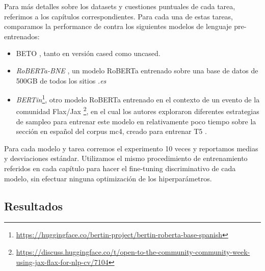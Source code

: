 Para más detalles sobre los datasets y cuestiones puntuales de cada tarea, referimos a los capítulos correspondientes. Para cada una de estas tareas, comparamos la performance de \robertuito{} contra los siguientes modelos de lenguaje pre-entrenados:

\begin{itemize}
    \item BETO \cite{canete2020spanish}, tanto en versión cased como uncased.
    \item \emph{RoBERTa-BNE} \cite{gutierrezfandino2021spanish}, un modelo RoBERTa entrenado sobre una base de datos de 500GB de todos los sitios \emph{.es}
    \item \emph{BERTin}\footnote{\url{https://huggingface.co/bertin-project/bertin-roberta-base-spanish}}, otro modelo RoBERTa entrenado en el contexto de un evento de la comunidad Flax/Jax \footnote{\url{https://discuss.huggingface.co/t/open-to-the-community-community-week-using-jax-flax-for-nlp-cv/7104}}, en el cual los autores exploraron diferentes estrategias de sampleo para entrenar este modelo en relativamente poco tiempo sobre la sección en español del corpus mc4, creado para entrenar T5 \cite{raffel2020exploringt5}.
\end{itemize}

Para cada modelo y tarea corremos el experimento 10 veces y reportamos medias y desviaciones estándar. Utilizamos el mismo procedimiento de entrenamiento referidos en cada capítulo para hacer el fine-tuning discriminativo de cada modelo, sin efectuar ninguna optimización de los hiperparámetros.



\subsection{Resultados}


